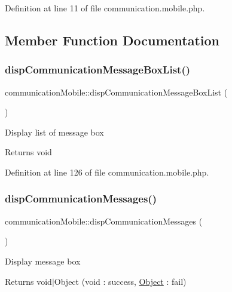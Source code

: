 Definition at line 11 of file communication.\+mobile.\+php.



\subsection{Member Function Documentation}
\hypertarget{classcommunicationMobile_a0f5fde87f62229177aa693fbc51c99d2}{}\label{classcommunicationMobile_a0f5fde87f62229177aa693fbc51c99d2} 
\subsubsection{\texorpdfstring{disp\+Communication\+Message\+Box\+List()}{dispCommunicationMessageBoxList()}}
{\footnotesize\ttfamily communication\+Mobile\+::disp\+Communication\+Message\+Box\+List (\begin{DoxyParamCaption}{ }\end{DoxyParamCaption})}

Display list of message box \begin{DoxyReturn}{Returns}
void 
\end{DoxyReturn}


Definition at line 126 of file communication.\+mobile.\+php.

\hypertarget{classcommunicationMobile_a1ff627f6e2111856cc297c2291dca2c7}{}\label{classcommunicationMobile_a1ff627f6e2111856cc297c2291dca2c7} 
\subsubsection{\texorpdfstring{disp\+Communication\+Messages()}{dispCommunicationMessages()}}
{\footnotesize\ttfamily communication\+Mobile\+::disp\+Communication\+Messages (\begin{DoxyParamCaption}{ }\end{DoxyParamCaption})}

Display message box \begin{DoxyReturn}{Returns}
void$\vert$\+Object (void \+: success, \hyperlink{classObject}{Object} \+: fail) 
\end{DoxyReturn}


